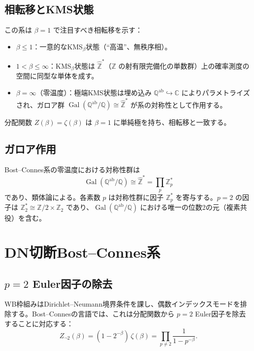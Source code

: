 \documentclass[12pt,a4paper]{article}
\newcommand{\Gal}{\operatorname{Gal}}
\newcommand{\Zhat}{\hat{\mathbb{Z}}}
\newcommand{\Qab}{\mathbb{Q}^{\mathrm{ab}}}
\begin{document}
\subsection{相転移とKMS状態}

この系は $\beta = 1$ で注目すべき相転移を示す：

\begin{itemize}
\item $\beta \leq 1$：一意的なKMS$_\beta$状態（``高温''、無秩序相）。
\item $1 < \beta \leq \infty$：KMS$_\beta$状態は $\Zhat^*$（$\mathbb{Z}$ の射有限完備化の単数群）上の確率測度の空間に同型な単体を成す。
\item $\beta = \infty$（零温度）：極端KMS状態は埋め込み $\Qab \hookrightarrow \mathbb{C}$ によりパラメトライズされ、ガロア群 $\Gal(\Qab/\mathbb{Q}) \cong \Zhat^*$ が系の対称性として作用する。
\end{itemize}

分配関数 $Z(\beta) = \zeta(\beta)$ は $\beta = 1$ に単純極を持ち、相転移と一致する。

\subsection{ガロア作用}

Bost--Connes系の零温度における対称性群は
\begin{equation}
  \Gal(\Qab/\mathbb{Q}) \cong \Zhat^* = \prod_p \mathbb{Z}_p^*
\end{equation}
であり、類体論による。各素数 $p$ は対称性群に因子 $\mathbb{Z}_p^*$ を寄与する。$p=2$ の因子は $\mathbb{Z}_2^* \cong \mathbb{Z}/2 \times \mathbb{Z}_2$ であり、$\Gal(\Qab/\mathbb{Q})$ における唯一の位数2の元（複素共役）を含む。

\section{DN切断Bost--Connes系}
\label{sec:DN-BC}

\subsection{$p=2$ Euler因子の除去}

WB枠組みはDirichlet--Neumann境界条件を課し、偶数インデックスモードを排除する。Bost--Connesの言語では、これは分配関数から $p=2$ Euler因子を除去することに対応する：
\begin{equation}\label{eq:DN-partition}
  Z_{\neg 2}(\beta) = (1 - 2^{-\beta})\,\zeta(\beta) = \prod_{p \neq 2}\frac{1}{1-p^{-\beta}}.
\end{equation}
\end{document}
